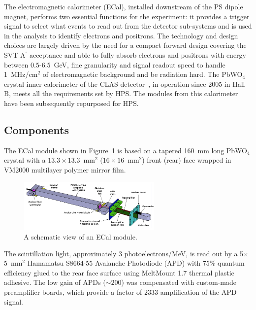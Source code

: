 \documentclass[final,3p,times,twocolumn]{elsarticle}
\newcommand{\Aprime}{A\ensuremath{^\prime}}
\begin{document}
The electromagnetic calorimeter (ECal), installed downstream of the PS dipole magnet, performs two 
essential functions for the experiment: it provides a trigger signal to select what events to read out from 
the detector sub-systems and is used in the analysis to identify electrons and positrons. 
The technology and design choices are largely driven by the need for a compact forward design 
covering the SVT \Aprime{} acceptance and able to fully absorb 
electrons and positrons with energy between $0.5$-$6.5$~GeV, fine granularity and signal 
readout speed to handle 1~MHz/cm$^{2}$ of electromagnetic background and be radiation hard. 
The PbWO$_{4}$ crystal inner 
calorimeter of the CLAS detector~\cite{2008erhm.conf..421N}, in operation since 2005 in Hall B, meets 
all the requirements set by HPS. The modules from this calorimeter have been subsequently 
repurposed for HPS. 


\subsection{Components}

The ECal module shown in Figure~\ref{fig:ecal-module} is based on a tapered 160~mm long 
PbWO$_{4}$ crystal with a $13.3\times13.3$~mm$^2$ ($16\times16$~mm$^2$) front 
(rear) face wrapped in VM2000 multilayer polymer mirror film. 
\begin{figure}[]
\begin{center}
{\small
\includegraphics[width=7cm]{figures/ecal-module-schematic.png}
\caption{A schematic view of an ECal module.}
\label{fig:ecal-module}
}
\end{center}
\end{figure}
The scintillation light, approximately $3$ photoelectrons/MeV, is read out by a 
5$\times$5~mm$^2$ Hamamatsu S8664-55 Avalanche Photodiode (APD) with 75\% quantum 
efficiency glued to the rear face surface using MeltMount 1.7 thermal plastic adhesive. 
The low gain of APDs ($\sim 200$) was compensated with custom-made preamplifier boards, which 
provide a factor of $2333$ amplification of the APD signal.
\end{document}
